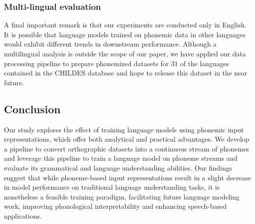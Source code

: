 


\subsubsection{Multi-lingual evaluation}
\label{sec:limitations} 

A final important remark is that our experiments are conducted only in English. It is possible that language models trained on phonemic data in other languages would exhibit different trends in downstream performance. Although a multilingual analysis is outside the scope of our paper, we have applied our data processing pipeline to prepare phonemized datasets for 31 of the languages contained in the CHILDES database and hope to release this dataset in the near future.

\subsection{Conclusion}

Our study explores the effect of training language models using phonemic input representations, which offer both analytical and practical advantages. We develop a pipeline to convert orthographic datasets into a continuous stream of phonemes and leverage this pipeline to train a language model on phoneme streams and evaluate its grammatical and language understanding abilities. Our findings suggest that while phoneme-based input representations result in a slight decrease in model performance on traditional language understanding tasks, it is nonetheless a feasible training paradigm, facilitating future language modeling work, improving phonological interpretability and enhancing speech-based applications.  

